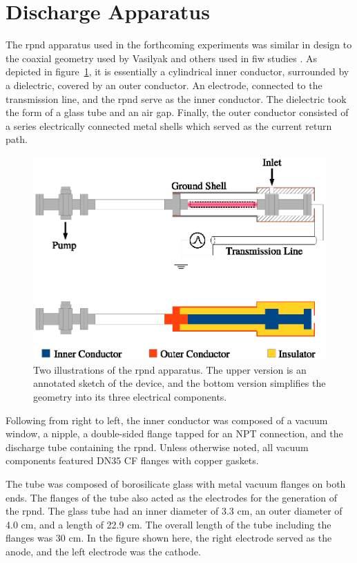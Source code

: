 \section{Discharge Apparatus}

The \acs{rpnd} apparatus used in the forthcoming experiments was similar in
design to the coaxial geometry used by Vasilyak and others used in \acs{fiw}
studies \cite{Vasilyak1994}. As depicted in figure~\ref{fig:appschem}, it is
essentially a cylindrical inner conductor, surrounded by a dielectric, covered
by an outer conductor. An electrode, connected to the transmission line, and the
\acs{rpnd} serve as the inner conductor. The dielectric took the form of a glass
tube and an air gap. Finally, the outer conductor consisted of a series
electrically connected metal shells which served as the current return path.
\begin{figure}
  \centering
  \includegraphics{./chapters/experiment/figures/appschem.eps}
  \caption{Two illustrations of the \acs{rpnd} apparatus. The upper version is
    an annotated sketch of the device, and the bottom version simplifies the
    geometry into its three electrical components.}
  \label{fig:appschem}
\end{figure}
Following from right to left, the inner conductor was composed of a vacuum
window, a nipple, a double-sided flange tapped for an NPT connection, and the
discharge tube containing the \acs{rpnd}. Unless otherwise noted, all vacuum
components featured DN35 CF flanges with copper gaskets.

The tube was composed of borosilicate glass with metal vacuum flanges on both
ends. The flanges of the tube also acted as the electrodes for the generation of
the \acs{rpnd}. The glass tube had an inner diameter of 3.3 cm, an outer
diameter of 4.0 cm, and a length of 22.9 cm. The overall length of the tube
including the flanges was 30 cm. In the figure shown here, the right electrode
served as the anode, and the left electrode was the cathode.

